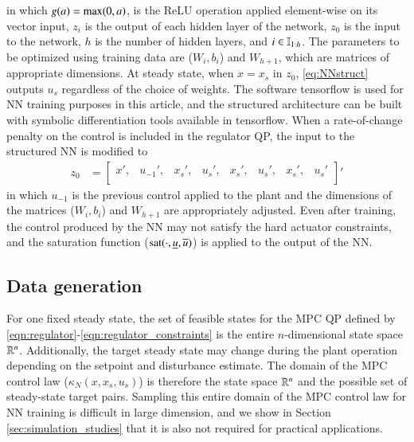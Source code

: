 \documentclass[preprint,5p, twocolumn, authoryear]{elsarticle}
\begin{document}
in which $g(a) = \textnormal{max} (0, a)$, is the ReLU operation applied
element-wise on its vector input, $z_i$ is the output of each hidden layer of
the network, $z_0$ is the input to the network, $h$ is the number of hidden
layers, and $i \in \mathbb{I}_{1:h}$. The parameters to be optimized using training
data are ($W_i, b_i$) and $W_{h+1}$, which are matrices of appropriate
dimensions. At steady state, when $x=x_s$ in $z_0$, \eqref{eq:NNstruct} outputs
$u_s$ regardless of the choice of weights. The software tensorflow
\citep{abadi:agarwal:barham:brevdo:et-al:2015} is used for NN training purposes
in this article, and the structured architecture can be built with symbolic
differentiation tools available in tensorflow. When a rate-of-change penalty on
the control is included in the regulator QP, the input to the structured NN is
modified to 
\begin{align*}
    z_0 &= 
    \begin{bmatrix}
    x', & u_{-1}', & x_s', & u_s', & x_s', & u_s', & x_s', & u_s' \\
    \end{bmatrix}'
\end{align*}
in which $u_{-1}$ is the previous control applied to the plant and the
dimensions of the matrices ($W_i, b_i$) and $W_{h+1}$ are appropriately
adjusted. Even after training, the control produced by the NN may not satisfy
the hard actuator constraints, and the saturation function
($\textnormal{sat}(\cdot, \underline{u}, \overline{u})$) is applied to the
output of the NN.

\subsection{Data generation}

For one fixed steady state, the set of feasible states for the MPC QP defined by
\eqref{eqn:regulator}-\eqref{eqn:regulator_constraints} is the entire
$n$-dimensional state space $\mathbb{R}^n$. Additionally, the target steady state may
change during the plant operation depending on the setpoint and disturbance
estimate. The domain of the MPC control law ($\kappa_N(x, x_s, u_s)$) is
therefore the state space $\mathbb{R}^{n}$ and the possible set of steady-state target
pairs. Sampling this entire domain of the MPC control law for NN training is
difficult in large dimension, and we show in Section
\ref{sec:simulation_studies} that it is also not required for practical
applications. 
\end{document}
